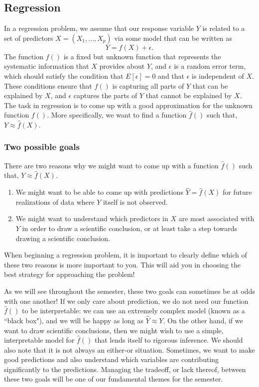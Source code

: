 \documentclass[titlepage,10pt]{scrartcl}
\begin{document}
\subsection{Regression}

In a regression problem, we assume that our response variable $Y$ is related to a set of predictors $X= (X_1,\ldots,X_p)$ via some model that can be written as
\begin{equation}
\label{eq_model}
Y = f(X)+\epsilon. 
\end{equation}
The function $f()$ is a fixed but unknown function that represents the systematic information that $X$ provides about $Y$, and $\epsilon$ is a random error term, which should satisfy the condition that $E[\epsilon] = 0$ and that $\epsilon$ is independent of $X$. These conditions ensure that $f()$ is capturing all parts of $Y$ that can be explained by $X$, and $\epsilon$ captures the parts of $Y$ that cannot be explained by $X$. The task in regression is to come up with a good approximation for the unknown function $f()$. More specifically, we want to find a function $\hat{f}()$ such that, $Y \approx \hat{f}(X)$. 

\subsubsection{Two possible goals}

There are two reasons why we might want to come up with a function $\hat{f}()$ such that, $Y \approx \hat{f}(X)$. 
\begin{enumerate}
\item We might want to be able to come up with predictions 	$\hat{Y} = \hat{f}(X)$ for future realizations of data where $Y$ itself is not observed.
\item We might want to understand which predictors in $X$ are most associated with $Y$ in order to draw a scientific conclusion, or at least take a step towards drawing a scientific conclusion. 
\end{enumerate}
When beginning a regression problem, it is important to clearly define which of these two reasons is more important to you. This will aid you in choosing the best strategy for approaching the problem! 

As we will see throughout the semester, these two goals can sometimes be at odds with one another! If we only care about prediction, we do not need our function $\hat{f}()$ to be interpretable: we can use an extremely complex model (known as a ``black box"), and we will be happy as long as $\hat{Y} \approx Y$. On the other hand, if we want to draw scientific conclusions, then we might wish to use a simple, interpretable model for $\hat{f}()$ that lends itself to rigorous inference. We should also note that it is not always an either-or situation. Sometimes, we want to make good predictions and also understand which variables are contributing significantly to the predictions. Managing the tradeoff, or lack thereof, between these two goals will be one of our fundamental themes for the semester. 
\end{document}
